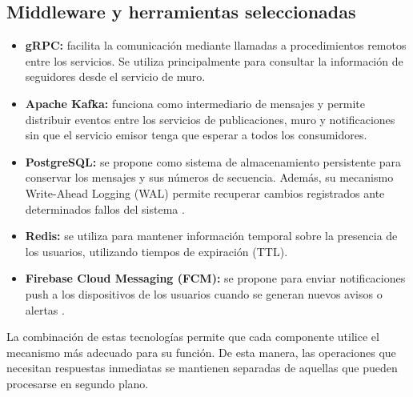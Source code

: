 \documentclass[12pt,a4paper]{article}
\begin{document}
\subsection{Middleware y herramientas seleccionadas}

\begin{itemize}

    \item \textbf{gRPC:} facilita la comunicación mediante
    llamadas a procedimientos remotos entre los servicios.
    Se utiliza principalmente para consultar la información
    de seguidores desde el servicio de muro.

    \item \textbf{Apache Kafka:} funciona como intermediario
    de mensajes y permite distribuir eventos entre los
    servicios de publicaciones, muro y notificaciones sin
    que el servicio emisor tenga que esperar a todos los
    consumidores.

  \item \textbf{PostgreSQL:} se propone como sistema
de almacenamiento persistente para conservar los mensajes
y sus números de secuencia. Además, su mecanismo
Write-Ahead Logging (WAL) permite recuperar cambios
registrados ante determinados fallos del sistema
\cite{postgresql}.

    \item \textbf{Redis:} se utiliza para mantener información
    temporal sobre la presencia de los usuarios, utilizando
    tiempos de expiración (TTL)\cite{redis}.

    \item \textbf{Firebase Cloud Messaging (FCM):} se propone
para enviar notificaciones push a los dispositivos de los
usuarios cuando se generan nuevos avisos o alertas
\cite{fcm}.

\end{itemize}

La combinación de estas tecnologías permite que cada
componente utilice el mecanismo más adecuado para su
función. De esta manera, las operaciones que necesitan
respuestas inmediatas se mantienen separadas de aquellas
que pueden procesarse en segundo plano.
\end{document}

